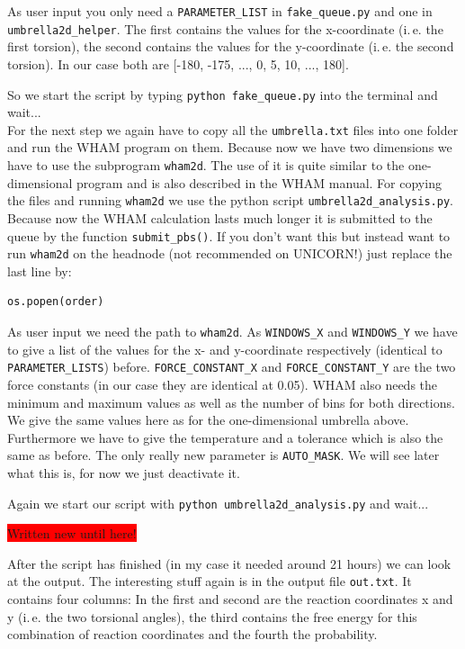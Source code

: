 \documentclass[a4paper,11pt]{scrartcl}
\begin{document}
As user input you only need a \texttt{PARAMETER\_LIST} in \texttt{fake\_queue.py} and one in \texttt{umbrella2d\_helper}. The first contains the values for the x-coordinate (i.\,e. the first torsion), the second contains the values for the y-coordinate (i.\,e. the second torsion). In our case both are [-180, -175, ..., 0, 5, 10, ..., 180].

So we start the script by typing \texttt{python fake\_queue.py} into the terminal and wait...\\

For the next step we again have to copy all the \texttt{umbrella.txt} files into one folder and run the WHAM program on them. Because now we have two dimensions we have to use the subprogram \texttt{wham2d}. The use of it is quite similar to the one-dimensional program and is also described in the WHAM manual. For copying the files and running \texttt{wham2d} we use the python script \texttt{umbrella2d\_analysis.py}. Because now the WHAM calculation lasts much longer it is submitted to the queue by the function \texttt{submit\_pbs()}. If you don't want this but instead want to run \texttt{wham2d} on the headnode (not recommended on UNICORN!) just replace the last line by:
\begin{lstlisting}[frame=single,language=python,basicstyle=\footnotesize,commentstyle=\color{red},keywordstyle=\color{blue},stringstyle=\color{mygreen}]
    os.popen(order)
\end{lstlisting}

As user input we need the path to \texttt{wham2d}. As \texttt{WINDOWS\_X} and \texttt{WINDOWS\_Y} we have to give a list of the values for the x- and y-coordinate respectively (identical to \texttt{PARAMETER\_LISTS}) before. \texttt{FORCE\_CONSTANT\_X} and \texttt{FORCE\_CONSTANT\_Y} are the two force constants (in our case they are identical at 0.05). WHAM also needs the minimum and maximum values as well as the number of bins for both directions. We give the same values here as for the one-dimensional umbrella above. Furthermore we have to give the temperature and a tolerance which is also the same as before. The only really new parameter is \texttt{AUTO\_MASK}. We will see later what this is, for now we just deactivate it.

Again we start our script with \texttt{python umbrella2d\_analysis.py} and wait...

\colorbox{red}{Written new until here!}

After the script has finished (in my case it needed around 21 hours) we can look at the output. The interesting stuff again is in the output file \texttt{out.txt}. It contains four columns: In the first and second are the reaction coordinates x and y (i.\,e. the two torsional angles), the third contains the free energy for this combination of reaction coordinates and the fourth the probability. 
\end{document}
